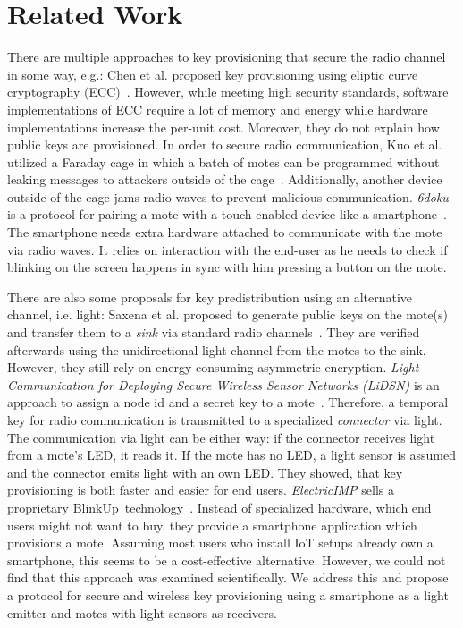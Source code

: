 \documentclass{ewsn-proc} %
\begin{document}
\section{Related Work}
\label{sec:related_work}

There are multiple approaches to key provisioning that secure the radio channel in some way, e.g.:
Chen et al. proposed key provisioning using eliptic curve cryptography (ECC)~\cite{chen2011over}.
However, while meeting high security standards, software implementations of ECC require a lot of memory and energy while hardware implementations increase the per-unit cost.
Moreover, they do not explain how public keys are provisioned.
In order to secure radio communication, Kuo et al. utilized a Faraday cage in which a batch of motes can be programmed without leaking messages to attackers outside of the cage~\cite{kuo2007message}.
Additionally, another device outside of the cage jams radio waves to prevent malicious communication.
\textit{6doku} is a protocol for pairing  a mote with a touch-enabled device like a smartphone~\cite{krentz20156doku}.
The smartphone needs extra hardware attached to communicate with the mote via radio waves.
It relies on interaction with the end-user as he needs to check if blinking on the screen happens in sync with him pressing a button on the mote.

There are also some proposals for key predistribution using an alternative channel, i.e. light:
Saxena et al. proposed to generate public keys on the mote(s) and transfer them to a \textit{sink} via standard radio channels~\cite{saxena2009blink}.
They are verified afterwards using the unidirectional light channel from the motes to the sink.
However, they still rely on energy consuming asymmetric encryption.
\textit{Light Communication for Deploying Secure Wireless Sensor Networks (LiDSN)} is an approach to assign a node id and a secret key to a mote~\cite{doan2012lidsn}.
Therefore, a temporal key for radio communication is transmitted to a specialized \textit{connector} via light.
The communication via light can be either way: if the connector receives light from a mote's LED, it reads it. 
If the mote has no LED, a light sensor is assumed and the connector emits light with an own LED.
They showed, that key provisioning is both faster and easier for end users.
\textit{ElectricIMP} sells a proprietary BlinkUp\texttrademark~technology~\cite{electricimp}.
Instead of specialized hardware, which end users might not want to buy, they provide a smartphone application which provisions a mote.
Assuming most users who install IoT setups already own a smartphone, this seems to be a cost-effective alternative.
However, we could not find that this approach was examined scientifically.
We address this and propose a protocol for secure and wireless key provisioning using a smartphone as a light emitter and motes with light sensors as receivers.
\end{document}
